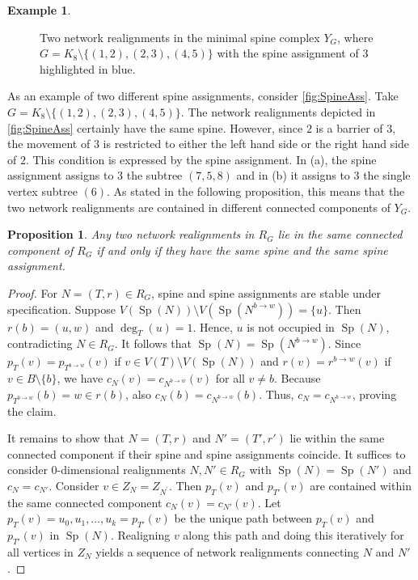 \documentclass[reqno,dvipsnames]{amsart}
\theoremstyle{plain}
\newtheorem{proposition}[theorem]{Proposition}
\numberwithin{equation}{section}
\theoremstyle{definition}
\newtheorem{example}[theorem]{Example}
\DeclareMathOperator{\degree}{deg}
\DeclareMathOperator{\Sp}{Sp}
\begin{document}
\begin{example}
\begin{figure}[tbp]
		\vspace{-3mm}
		\caption{Two network realignments in the minimal spine complex $Y_G$, where $G = K_8 \setminus \{(1,2),(2,3),(4,5)\}$ with the spine assignment of 3 highlighted in blue.}
		\label{fig:SpineAss}
	\end{figure}
	As an example of two different spine assignments, consider \autoref{fig:SpineAss}. Take $G=K_8 \setminus \{(1,2),(2,3),(4,5)\}$. The network realignments depicted in \autoref{fig:SpineAss} certainly have the same spine. However, since $2$ is a barrier of $3$, the movement of $3$ is restricted to either the left hand side or the right hand side of $2$. This condition is expressed by the spine assignment. In (a), the spine assignment assigns to $3$ the subtree $(7,5,8)$ and in (b) it assigns to $3$ the single vertex subtree $(6)$. As stated in the following proposition, this means that the two network realignments are contained in different connected components of $Y_G$.
\end{example}

\begin{proposition}\label{prop:ResidualComponents}
	Any two network realignments in $R_G$ lie in the same connected component of $R_G$ if and only if they have the same spine and the same spine assignment.
\end{proposition}

\begin{proof}
	For $N=(T,r)\in R_G$, spine and spine assignments are stable under specification. Suppose $V(\Sp(N)) \setminus V(\Sp(N^{b\to w})) = \{u\}$. Then $r(b) = (u,w)$ and $\degree_T(u)=1$. Hence, $u$ is not occupied in $\Sp(N)$, contradicting $N\in R_G$. It follows that $\Sp(N) = \Sp(N^{b\to w})$. Since $p_T(v) = p_{T^{b\to w}} (v)$ if $v\in V(T)\setminus V(\Sp(N))$ and $r(v) = r^{b\to w}(v)$ if $v\in B\setminus\{b\}$, we have $c_N(v) = c_{N^{b\to w}} (v)$ for all $v\neq b$. Because $p_{T^{b\to w}} (b) = w\in r(b)$, also $c_N(b) = c_{N^{b\to w}}(b)$. Thus, $c_N = c_{N^{b\to w}}$, proving the claim.
	
	It remains to show that $N = (T,r)$ and $N' = (T',r')$ lie within the same connected component if their spine and spine assignments coincide. It suffices to consider 0-dimensional realignments $N,N'\in R_G$ with $\Sp(N) = \Sp(N')$ and $c_N = c_{N'}$. Consider $v\in Z_N = Z_{N^\prime}$. Then $p_T(v)$ and $p_{T'}(v)$ are contained within the same connected component $c_N (v) = c_{N'} (v)$. Let $p_T(v) = u_0, u_1,\ldots, u_k = p_{T'}(v)$ be the unique path between $p_T(v)$ and $p_{T'}(v)$ in $\Sp(N)$. Realigning $v$ along this path and doing this iteratively for all vertices in $Z_N$ yields a sequence of network realignments connecting $N$ and $N'$.
\end{proof}
\end{document}

